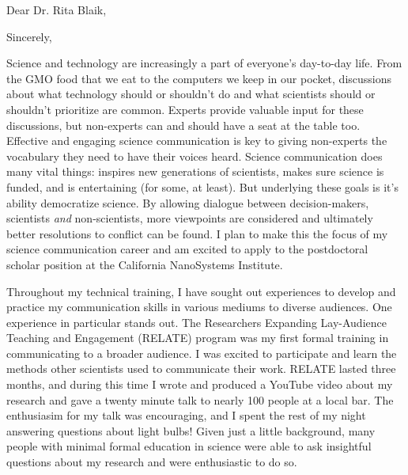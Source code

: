 \thispagestyle{empty}

\date{November 30, 2018}
\opening{Dear Dr. Rita Blaik,}
\closing{Sincerely,}
\makelettertitle

Science and technology are increasingly a part of everyone's day-to-day life. From the GMO food that we eat to the computers we keep in our pocket, discussions about what technology should or shouldn't do and what scientists should or shouldn't prioritize are common. Experts provide valuable input for these discussions, but non-experts can and should have a seat at the table too. Effective and engaging science communication is key to giving non-experts the vocabulary they need to have their voices heard. Science communication does many vital things: inspires new generations of scientists, makes sure science is funded, and is entertaining (for some, at least). But underlying these goals is it's ability democratize science. By allowing dialogue between decision-makers, scientists \textit{and} non-scientists, more viewpoints are considered and ultimately better resolutions to conflict can be found. I plan to make this the focus of my science communication career and am excited to apply to the postdoctoral scholar position at the California NanoSystems Institute. 

Throughout my technical training, I have sought out experiences to develop and practice my communication skills in various mediums to diverse audiences. One experience in particular stands out. The Researchers Expanding Lay-Audience Teaching and Engagement (RELATE) program was my first formal training in communicating to a broader audience. I was excited to participate and learn the methods other scientists used to communicate their work. RELATE lasted three months, and during this time I wrote and produced a YouTube video about my research and gave a twenty minute talk to nearly 100 people at a local bar. The enthusiasim for my talk was encouraging, and I spent the rest of my night answering questions about light bulbs! Given just a little background, many people with minimal formal education in science were able to ask insightful questions about my research and were enthusiastic to do so. 

